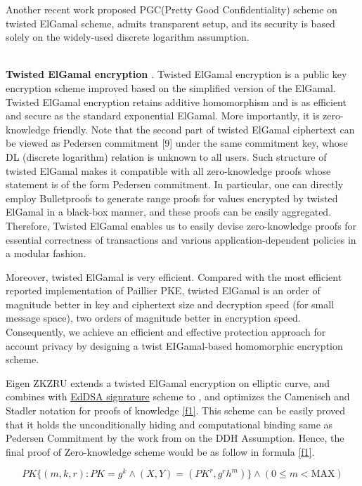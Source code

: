 \documentclass{article}
\begin{document}
Another recent work \cite{chen2020pgc} proposed PGC(Pretty Good Confidentiality) scheme on twisted ElGamal scheme, admits transparent setup, and its security is based solely on the widely-used discrete logarithm assumption. 

~\\
\noindent\textbf{Twisted ElGamal encryption \cite{chen2020pgc}}. Twisted ElGamal encryption is a public key encryption scheme improved based on the simplified version of the ElGamal. Twisted ElGamal encryption retains additive homomorphism and is as efficient and secure as the standard exponential ElGamal. More importantly, it is zero-knowledge friendly. Note that the second part of twisted ElGamal ciphertext can be viewed as Pedersen commitment [9] under the same commitment key, whose DL (discrete logarithm) relation is unknown to all users. Such structure of twisted ElGamal makes it compatible with all zero-knowledge proofs whose statement is of the form Pedersen commitment. In particular, one can directly employ Bulletproofs\cite{bunz2018bulletproofs} to generate range proofs for values encrypted by twisted ElGamal in a black-box manner, and these proofs can be easily aggregated. Therefore, Twisted ElGamal enables us to easily devise zero-knowledge proofs for essential correctness of transactions and various application-dependent policies in a modular fashion. 

Moreover, twisted ElGamal is very efficient. Compared with the most efficient reported implementation of Paillier PKE, twisted ElGamal is an order of magnitude better in key and ciphertext size and decryption speed (for small message space), two orders of magnitude better in encryption speed. Consequently, we achieve an efficient and effective protection approach for account privacy by designing a twist EIGamal-based homomorphic encryption scheme.

Eigen ZKZRU extends a twisted ElGamal encryption on elliptic curve, and combines with \href{https://datatracker.ietf.org/doc/html/rfc8032}{EdDSA signrature} scheme to , and optimizes the Camenisch and Stadler \cite{camenisch1997efficient} notation for proofs of knowledge \ref{f1}. This scheme can be easily proved that it holds the unconditionally hiding and computational binding same as Pedersen Commitment by the work from \cite{bunz2020zether,chen2020pgc} on the DDH Assumption. Hence, the final proof of Zero-knowledge scheme would be as follow in formula \ref{f1}.

\begin{equation}
 PK\{(m, k, r): PK = g^k \land (X, Y) = (PK^{r}, g^r h^m)\} \land (0 \leq m < \mbox{MAX}) \label{f1}  
\end{equation}
\end{document}
